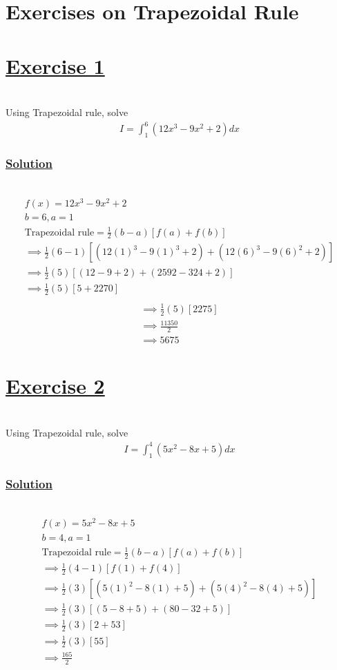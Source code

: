 \documentclass[12pt]{report}
\newcommand{\ubt}[1]{\textbf{\underline{#1}}}
\newcommand{\spn}[1]{\\[#1cm]}
\newcommand{\solution}{\subsubsection{\ubt{Solution}}{~}\spn{-2}}
\newcommand{\exercise}[1]{\section*{\ubt{Exercise #1}}{~}\spn{-1}}
\begin{document}
	\section{Exercises on Trapezoidal Rule}
	\exercise{1}
	Using Trapezoidal rule, solve
	\begin{eqnarray*}
		I = \int_1^6 (12x^3 - 9x^2 + 2) dx
	\end{eqnarray*}
	\solution
	\begin{gather*}
		f(x) = 12x^3 - 9x^2 + 2\\
		b=6, a=1\\
		\text{Trapezoidal rule} = \frac{1}{2}(b-a)[f(a) + f(b)]\\
		\implies \frac{1}{2} (6-1) [(12(1)^3 - 9(1)^3 + 2) + (12(6)^3 - 9(6)^2 + 2)]\\
		\implies \frac{1}{2} (5) [(12-9+2) + (2592-324 + 2)]\\
		\implies \frac{1}{2} (5) [5+2270]\\
	\end{gather*}
	\begin{gather*}
		\implies \frac{1}{2} (5)[2275]\\
		\implies \frac{11350}{2}\\
		\implies 5675
	\end{gather*}
	
	\exercise{2}
	Using Trapezoidal rule, solve
	\begin{gather*}
		I=\int_1^4(5x^2-8x+5)dx
	\end{gather*}
	\solution
	\begin{gather*}
		f(x) = 5x^2 - 8x + 5\\
		b=4, a=1\\
		\text{Trapezoidal rule} = \frac{1}{2}(b-a)[f(a) + f(b)]\\
		\implies \frac{1}{2}(4-1)[f(1) + f(4)]\\
		\implies \frac{1}{2}(3)[(5(1)^2 - 8(1) + 5) + (5(4)^2 - 8(4) + 5)]\\
		\implies \frac{1}{2}(3)[(5-8+5) + (80-32+5)]\\
		\implies \frac{1}{2}(3)[2+53]\\
		\implies \frac{1}{2}(3)[55]\\
		\implies \frac{165}{2}
	\end{gather*}
	
	
\end{document}
